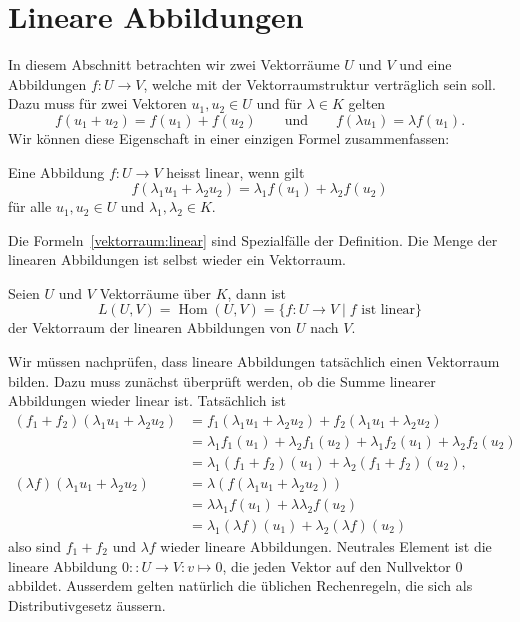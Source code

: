 %
%
%
\section{Lineare Abbildungen%
\label{section:vektorraum:linabb}}
In diesem Abschnitt betrachten wir zwei Vektorräume $U$ und $V$ und
eine Abbildungen $f\colon U\to V$, welche mit der Vektorraumstruktur
verträglich sein soll. 
Dazu muss für zwei Vektoren $u_1,u_2\in U$ und für $\lambda\in K$ gelten
\begin{equation}
f(u_1+u_2)=f(u_1)+f(u_2)
\qquad\text{und}\qquad
f(\lambda u_1)=\lambda f(u_1).
\label{vektorraum:linear}
\end{equation}
Wir können diese Eigenschaft in einer einzigen Formel zusammenfassen:

\begin{definition}
Eine Abbildung $f\colon U\to V$ heisst linear, wenn gilt
\[
f(\lambda_1 u_1+\lambda_2 u_2)=\lambda_1 f(u_1) + \lambda_2 f(u_2)
\]
für alle $u_1,u_2\in U$ und $\lambda_1,\lambda_2\in K$.
\end{definition}

Die Formeln~\eqref{vektorraum:linear} sind Spezialfälle der Definition.
Die Menge der linearen Abbildungen ist selbst wieder ein Vektorraum.

\begin{definition}
Seien $U$ und $V$ Vektorräume über $K$, dann ist
\[
L(U,V)
=
\operatorname{Hom}(U,V)
=
\{f\colon U\to V\;|\; \text{$f$ ist linear}\}
\]
der Vektorraum der linearen Abbildungen von $U$ nach $V$.
\end{definition}

Wir müssen nachprüfen, dass lineare Abbildungen tatsächlich einen
Vektorraum bilden. 
Dazu muss zunächst überprüft werden, ob die Summe linearer Abbildungen
wieder linear ist.
Tatsächlich ist
\begin{align*}
(f_1+f_2)(\lambda_1u_1+\lambda_2 u_2)
&=
f_1(\lambda_1u_1+\lambda_2 u_2)
+
f_2(\lambda_1u_1+\lambda_2 u_2)
\\
&=
\lambda_1f_1(u_1)+\lambda_2f_1(u_2)
+
\lambda_1f_2(u_1)+\lambda_2 f_2(u_2)
\\
&=
\lambda_1(f_1 + f_2)(u_1)+\lambda_2(f_1+f_2)(u_2),
\\
(\lambda f)(\lambda_1 u_1 + \lambda_2 u_2)
&=
\lambda (f(\lambda_1 u_1 + \lambda_2 u_2))
\\
&=
\lambda\lambda_1 f(u_1)
+
\lambda\lambda_2 f(u_2)
\\
&=
\lambda_1 (\lambda f)(u_1)
+
\lambda_2 (\lambda f)(u_2)
\end{align*}
also sind $f_1+f_2$ und $\lambda f$ wieder lineare Abbildungen.
Neutrales Element ist die lineare Abbildung $0:\colon U\to V:v\mapsto 0$,
die jeden Vektor auf den Nullvektor $0$ abbildet.
Ausserdem gelten natürlich die üblichen Rechenregeln, die sich als
Distributivgesetz äussern.


